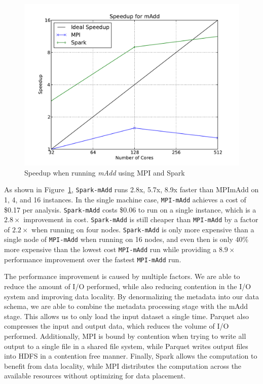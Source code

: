 \documentclass[10pt]{report} %
\begin{document}
\begin{figure}[h]
\begin{center}
\includegraphics[width=0.99\linewidth]{graphs/speedup_madd.pdf}
\end{center}
\caption{Speedup when running \textit{mAdd} using MPI and Spark}
\label{fig:madd-speedup}
\end{figure}

As shown in Figure~\ref{fig:madd-speedup}, \texttt{Spark-mAdd} runs 2.8x, 5.7x, 8.9x faster than
MPImAdd on 1, 4, and 16 instances. In the single machine case, \texttt{MPI-mAdd} achieves a cost of \$0.17 per
analysis. \texttt{Spark-mAdd} costs \$0.06 to run on a single instance, which is a $2.8\times$ improvement in
cost. \texttt{Spark-mAdd} is still cheaper than \texttt{MPI-mAdd} by a factor of $2.2\times$ when running on four
nodes. \texttt{Spark-mAdd} is only more expensive than a single node of \texttt{MPI-mAdd} when running on 16
nodes, and even then is only 40\% more expensive than the lowest cost \texttt{MPI-mAdd} run while providing a
$8.9\times$ performance improvement over the fastest \texttt{MPI-mAdd} run.

The performance improvement is caused by multiple factors. We are able to reduce the amount of I/O performed,
while also reducing contention in the I/O system and improving data locality. By denormalizing the metadata into
our data schema, we are able to combine the metadata processing stage with the mAdd stage. This allows us
to only load the input dataset a single time. Parquet also compresses the input and output data, which reduces
the volume of I/O performed. Additionally, MPI is bound by contention when trying to write all output to a single
file in a shared file system, while Parquet writes output files into HDFS in a contention free manner. Finally, Spark
allows the computation to benefit from data locality, while MPI distributes the computation across the available
resources without optimizing for data placement.
\end{document}
